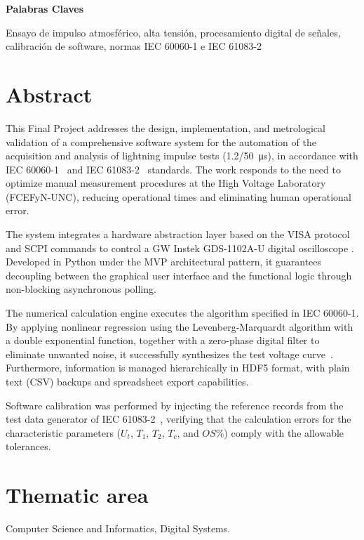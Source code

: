 \textbf{Palabras Claves}

Ensayo de impulso atmosférico, alta tensión, procesamiento digital de señales, calibración de software, normas IEC 60060-1 e IEC 61083-2




\newpage
\section*{Abstract}
This Final Project addresses the design, implementation, and metrological validation of a comprehensive software system for the automation of the acquisition and analysis of lightning impulse tests (\qty[parse-numbers=false]{1.2/50}{\micro\second}), in accordance with IEC 60060-1~\cite{iec60060_1} and IEC 61083-2~\cite{iec61083_2} standards. The work responds to the need to optimize manual measurement procedures at the High Voltage Laboratory (FCEFyN-UNC), reducing operational times and eliminating human operational error.

The system integrates a hardware abstraction layer based on the VISA protocol and SCPI commands to control a GW Instek GDS-1102A-U digital oscilloscope \cite{gds1000au_ProgrammingManual}. Developed in Python under the MVP architectural pattern, it guarantees decoupling between the graphical user interface and the functional logic through non-blocking asynchronous polling.

The numerical calculation engine executes the algorithm specified in IEC 60060-1. By applying nonlinear regression using the Levenberg-Marquardt algorithm with a double exponential function, together with a zero-phase digital filter to eliminate unwanted noise, it successfully synthesizes the test voltage curve~\cite{iec60060_1}. Furthermore, information is managed hierarchically in HDF5 format, with plain text (CSV) backups and spreadsheet export capabilities.

Software calibration was performed by injecting the reference records from the test data generator of IEC 61083-2~\cite{iec61083_2}, verifying that the calculation errors for the characteristic parameters ($U_t$, $T_1$, $T_2$, $T_c$, and $OS\%$) comply with the allowable tolerances.
\vspace{11pt}

\section*{Thematic area}
Computer Science and Informatics, Digital Systems.
\vspace{11pt}


